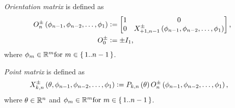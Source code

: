 \documentclass[stu, babel, american, biblatex, a4paper, draftall]{apa7}
\begin{document}
\begin{definition}\label{OrientationMatrix}
    \textit{Orientation matrix} is defined as
    \begin{align*}
        O^\pm_n\left(\phi_{n-1},\phi_{n-2},\dots,\phi_1\right) & \vcentcolon=
        \begin{bmatrix}
            1 & 0                                                             \\
            0 & X^\pm_{+1,n-1}\left(\phi_{n-1},\phi_{n-2},\dots,\phi_1\right) \\
        \end{bmatrix}\text{,}                                              \\
        O^\pm_0                                                & \vcentcolon= \pm I_1\text{,}
    \end{align*}
    where $\phi_m\in\mathbb{R}^m \text{for } m\in\set{1..n-1}$.
\end{definition}
\begin{definition}\label{PointMatrix}
    \textit{Point matrix} is defined as
    \begin{align*}
        X^\pm_{k,n}\left(\theta,\phi_{n-1},\phi_{n-2},\dots,\phi_1\right) & \vcentcolon=
        P_{k,n}\left(\theta\right)
        O^\pm_n\left(\phi_{n-1},\phi_{n-2},\dots,\phi_1\right)\text{,}
    \end{align*}
    where $\theta\in\mathbb{R}^n$ and $\phi_m\in\mathbb{R}^m \text{for } m\in\set{1..n-1}$.
\end{definition}
\end{document}
